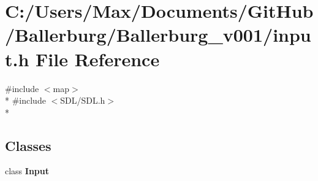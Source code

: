 \section{C\+:/\+Users/\+Max/\+Documents/\+Git\+Hub/\+Ballerburg/\+Ballerburg\+\_\+v001/input.h File Reference}
\label{input_8h}
{\ttfamily \#include $<$map$>$}\\*
{\ttfamily \#include $<$S\+D\+L/\+S\+D\+L.\+h$>$}\\*
\subsection*{Classes}
\begin{DoxyCompactItemize}
\item 
class {\bf Input}
\end{DoxyCompactItemize}
